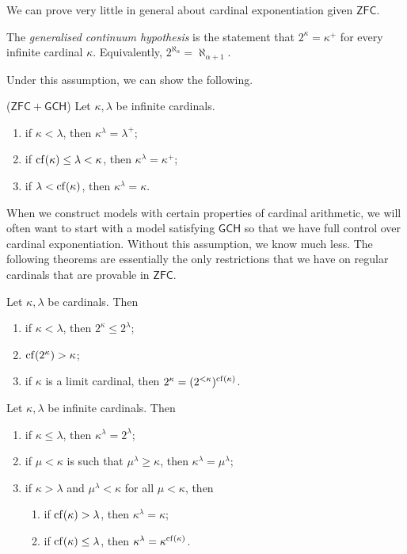 We can prove very little in general about cardinal exponentiation given \( \mathsf{ZFC} \).
\begin{definition}
    The \emph{generalised continuum hypothesis} is the statement that \( 2^\kappa = \kappa^+ \) for every infinite cardinal \( \kappa \).
    Equivalently, \( 2^{\aleph_\alpha} = \aleph_{\alpha + 1} \).
\end{definition}
Under this assumption, we can show the following.
\begin{theorem}
    (\( \mathsf{ZFC} + \mathsf{GCH} \))
    Let \( \kappa, \lambda \) be infinite cardinals.
    \begin{enumerate}
        \item if \( \kappa < \lambda \), then \( \kappa^\lambda = \lambda^+ \);
        \item if \( \operatorname{cf}(\kappa) \leq \lambda < \kappa \), then \( \kappa^\lambda = \kappa^+ \);
        \item if \( \lambda < \operatorname{cf}(\kappa) \), then \( \kappa^\lambda = \kappa \).
    \end{enumerate}
\end{theorem}
When we construct models with certain properties of cardinal arithmetic, we will often want to start with a model satisfying \( \mathsf{GCH} \) so that we have full control over cardinal exponentiation.
Without this assumption, we know much less.
The following theorems are essentially the only restrictions that we have on regular cardinals that are provable in \( \mathsf{ZFC} \).
\begin{theorem}
    Let \( \kappa, \lambda \) be cardinals.
    Then
    \begin{enumerate}
        \item if \( \kappa < \lambda \), then \( 2^\kappa \leq 2^\lambda \);
        \item \( \operatorname{cf}(2^\kappa) > \kappa \);
        \item if \( \kappa \) is a limit cardinal, then \( 2^\kappa = (2^{<\kappa})^{\operatorname{cf}(\kappa)} \).
    \end{enumerate}
\end{theorem}
\begin{theorem}
    Let \( \kappa, \lambda \) be infinite cardinals.
    Then
    \begin{enumerate}
        \item if \( \kappa \leq \lambda \), then \( \kappa^\lambda = 2^\lambda \);
        \item if \( \mu < \kappa \) is such that \( \mu^\lambda \geq \kappa \), then \( \kappa^\lambda = \mu^\lambda \);
        \item if \( \kappa > \lambda \) and \( \mu^\lambda < \kappa \) for all \( \mu < \kappa \), then
        \begin{enumerate}
            \item if \( \operatorname{cf}(\kappa) > \lambda \), then \( \kappa^\lambda = \kappa \);
            \item if \( \operatorname{cf}(\kappa) \leq \lambda \), then \( \kappa^\lambda = \kappa^{\operatorname{cf}(\kappa)} \).
        \end{enumerate}
    \end{enumerate}
\end{theorem}
